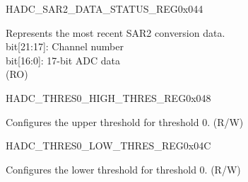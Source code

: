 \begin{register}{H}{ADC\_SAR2\_DATA\_STATUS\_REG}{0x044}\label{regdesc:ADCSAR2DATASTATUSREG}
%
%
\regnewline%
\begin{regdesc}\begin{reglist}
\label{fielddesc:ADCAPBSARADC2DATA}\item [ADC\_APB\_SARADC2\_DATA] Represents the most recent SAR2 conversion data.\\
bit[21:17]: Channel number\\
bit[16:0]: 17-bit ADC data\\
(RO)
\end{reglist}\end{regdesc}
\end{register}


\begin{register}{H}{ADC\_THRES0\_HIGH\_THRES\_REG}{0x048}\label{regdesc:ADCTHRES0HIGHTHRESREG}
%
%
\regnewline%
\begin{regdesc}\begin{reglist}
\label{fielddesc:ADCTHRES0HIGH}\item [ADC\_THRES0\_HIGH] Configures the upper threshold for threshold 0. (R/W)
\end{reglist}\end{regdesc}
\end{register}


\begin{register}{H}{ADC\_THRES0\_LOW\_THRES\_REG}{0x04C}\label{regdesc:ADCTHRES0LOWTHRESREG}
%
%
\regnewline%
\begin{regdesc}\begin{reglist}
\label{fielddesc:ADCTHRES0LOW}\item [ADC\_THRES0\_LOW] Configures the lower threshold for threshold 0. (R/W)
\end{reglist}\end{regdesc}
\end{register}


